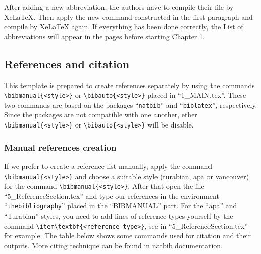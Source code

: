 \subsectionindent After adding a new abbreviation, the authors nave to compile their file by XeLaTeX. Then apply the new command constructed in the first paragraph and compile by XeLaTeX again. If everything has been done correctly, the List of abbreviations will appear in the pages before starting Chapter 1.

\subsection{References and citation}

\subsectionindent This template is prepared to create references separately by using the commands \verb|\bibmanual{<style>}| or \verb|\bibauto{<style>}| placed in “1\_MAIN.tex”. These two commands are based on the packages “\verb|natbib|” and “\verb|biblatex|”, respectively. Since the packages are not compatible with one another, ether \verb|\bibmanual{<style>}| or \verb|\bibauto{<style>}| will be disable.

\subsubsection{Manual references creation}
\subsubsectionindent If we prefer to create a reference list manually, apply the command \verb|\bibmanual{<style>}| and choose a suitable style (turabian, apa or vancouver) for the command \verb|\bibmanual{<style>}|. After that open the file “5\_ReferenceSection.tex” and type our references in the environment “\verb*|thebibliography|” placed in the “BIBMANUAL” part. For the “apa” and “Turabian” styles, you need to add lines of reference types yourself by the command \verb|\item\textbf{<reference type>}|, see in “5\_ReferenceSection.tex” for example. The table below shows some commands used for citation and their outputs. More citing technique can be found in natbib documentation.

